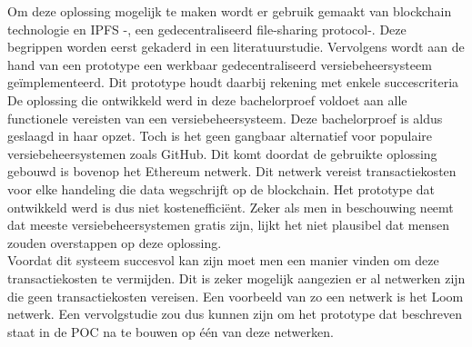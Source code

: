Om deze oplossing mogelijk te maken wordt er gebruik gemaakt van blockchain technologie en IPFS -, een gedecentraliseerd file-sharing protocol-. Deze begrippen worden eerst gekaderd in een literatuurstudie. Vervolgens wordt aan de hand van een prototype een werkbaar gedecentraliseerd versiebeheersysteem geïmplementeerd. Dit prototype houdt daarbij rekening met enkele succescriteria\\

De oplossing die ontwikkeld werd in deze bachelorproef voldoet aan alle functionele vereisten van een versiebeheersysteem. Deze bachelorproef is aldus geslaagd in haar opzet. Toch is het geen gangbaar alternatief voor populaire versiebeheersystemen zoals GitHub. Dit komt doordat de gebruikte oplossing gebouwd is bovenop het Ethereum netwerk. Dit netwerk vereist transactiekosten voor elke handeling die data wegschrijft op de blockchain. Het prototype dat ontwikkeld werd is dus niet kostenefficiënt. Zeker als men in beschouwing neemt dat meeste versiebeheersystemen gratis zijn, lijkt het niet plausibel dat mensen zouden overstappen op deze oplossing.\\

Voordat dit systeem succesvol kan zijn moet men een manier vinden om deze transactiekosten te vermijden. Dit is zeker mogelijk aangezien er al netwerken zijn die geen transactiekosten vereisen. Een voorbeeld van zo een netwerk is het Loom netwerk. Een vervolgstudie zou dus kunnen zijn om het prototype dat beschreven staat in de POC na te bouwen op één van deze netwerken.